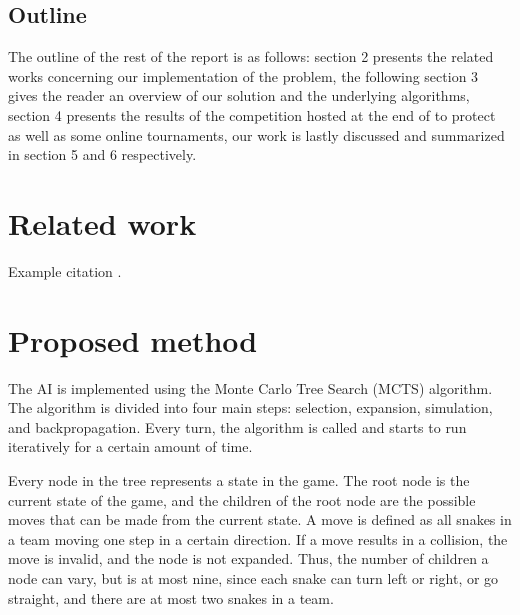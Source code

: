 \documentclass[a4paper,12pt]{article}
\begin{document}
\subsection{Outline}
The outline of the rest of the report is as follows: section 2 presents the related works concerning our implementation of the problem, the following section 3 gives the reader an overview of our solution and the underlying algorithms, section 4 presents the results of the competition hosted at the end of to protect as well as some online tournaments, our work is lastly discussed and summarized in section 5 and 6 respectively.


\newpage
\section{Related work}
\label{sec:relwork}

Example citation \cite{RussellNorvigAIBook3rd}.


\newpage
\section{Proposed method}
\label{sec:method}

The AI is implemented using the Monte Carlo Tree Search (MCTS) algorithm. The algorithm is divided into four main steps: selection, expansion, simulation, and backpropagation. Every turn, the algorithm is called and starts to run iteratively for a certain amount of time. 

Every node in the tree represents a state in the game. The root node is the current state of the game, and the children of the root node are the possible moves that can be made from the current state. A move is defined as all snakes in a team moving one step in a certain direction. If a move results in a collision, the move is invalid, and the node is not expanded. Thus, the number of children a node can vary, but is at most nine, since each snake can turn left or right, or go straight, and there are at most two snakes in a team. %

\end{document}
